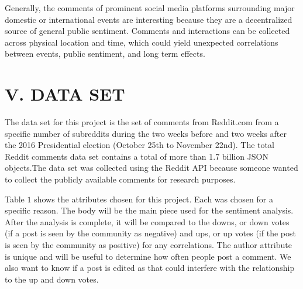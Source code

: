 \documentclass[letterpaper]{article}
\begin{document}
Generally, the comments of prominent social media platforms surrounding major domestic or international events are interesting because they are a decentralized source of general public sentiment. Comments and interactions can be collected across physical location and time, which could yield unexpected correlations between events, public sentiment, and long term effects.

\section{V. DATA SET}
The data set for this project is the set of comments from Reddit.com from a specific number of subreddits during the two weeks before and two weeks after the 2016 Presidential election (October 25th to November 22nd). The total Reddit comments data set contains a total of more than 1.7 billion JSON objects.The data set was collected using the Reddit API because someone wanted to collect the publicly available comments for research purposes.  

Table $1$ shows the attributes chosen for this project. Each was chosen for a specific reason. The body will be the main piece used for the sentiment analysis. After the analysis is complete, it will be compared to the downs, or down votes (if a post is seen by the community as negative) and ups, or up votes (if the post is seen by the community as positive) for any correlations. The author attribute is unique and will be useful to determine how often people post a comment. We also want to know if a post is edited as that could interfere with the relationship to the up and down votes.

\begin{table}[!hbt]
\caption{Data Set Attributes}
\end{table}
\end{document}
